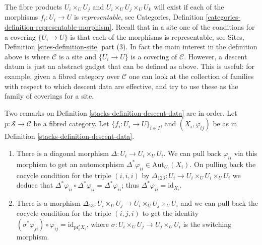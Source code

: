 The fibre products $U_i \times_U U_j$ and $U_i \times_U U_j \times_U U_k$
will exist if each of the morphisms $f_i : U_i \to U$ is {\it representable},
see Categories, Definition \ref{categories-definition-representable-morphism}.
Recall that in a site one of the conditions for a covering $\{U_i \to U\}$ is
that each of the morphisms is representable, see
Sites, Definition \ref{sites-definition-site} part (3).
In fact the main interest in the definition above is where $\mathcal{C}$
is a site and $\{U_i \to U\}$ is a covering of $\mathcal{C}$. However,
a descent datum is just an abstract gadget that can be defined as above.
This is useful: for example, given a fibred category over $\mathcal{C}$
one can look at the collection of families with respect to which descent data
are effective, and try to use these as the family of coverings for a site.

\begin{remarks}
\label{remarks-definition-descent-datum}
Two remarks on Definition \ref{stacks-definition-descent-data} are in order.
Let $p : \mathcal{S} \to \mathcal{C}$ be a fibred category.
Let $\{f_i : U_i \to U\}_{i \in I}$, and $(X_i, \varphi_{ij})$
be as in Definition \ref{stacks-definition-descent-data}.
\begin{enumerate}
\item There is a diagonal morphism $\Delta : U_i \to U_i \times_U U_i$.
We can pull back $\varphi_{ii}$ via this morphism to get an automorphism
$\Delta^\ast \varphi_{ii} \in \text{Aut}_{U_i}(X_i)$.
On pulling back the cocycle condition for the triple $(i, i, i)$
by $\Delta_{123} : U_i \to U_i \times_U U_i \times_U U_i$ we deduce that
$\Delta^\ast \varphi_{ii} \circ \Delta^\ast \varphi_{ii} =
\Delta^\ast \varphi_{ii}$; thus $\Delta^\ast \varphi_{ii} =
\text{id}_{X_i}$.
\item There is a morphism
$\Delta_{13}: U_i \times_U U_j \to U_i \times_U U_j \times_U U_i$
and we can pull back the
cocycle condition for the triple $(i, j, i)$ to get the
identity $(\sigma^\ast \varphi_{ji}) \circ \varphi_{ij} =
\text{id}_{\text{pr}_0^\ast X_i}$, where
$\sigma : U_i \times_U U_j \to U_j \times_U U_i$ is the switching morphism.
\end{enumerate}
\end{remarks}

